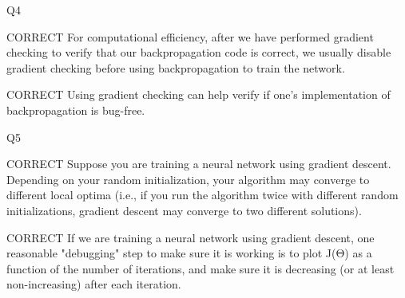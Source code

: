 \documentclass[11pt]{article} %
\begin{document}
\newpage

Q4

CORRECT For computational efficiency, after we have performed gradient checking to verify that our backpropagation code is correct, we usually disable gradient checking before using backpropagation to train the network.

CORRECT Using gradient checking can help verify if one's implementation of backpropagation is bug-free.


Q5

CORRECT Suppose you are training a neural network using gradient descent. Depending on your random initialization, 
your algorithm may converge to different local optima 
(i.e., if you run the algorithm twice with different random initializations, gradient descent may converge to two different solutions).

CORRECT If we are training a neural network using gradient descent, one reasonable "debugging" step to make sure it is working is to plot J(Θ) as a function of the number of iterations, and make sure it is decreasing (or at least non-increasing) after each iteration.
\end{document}
